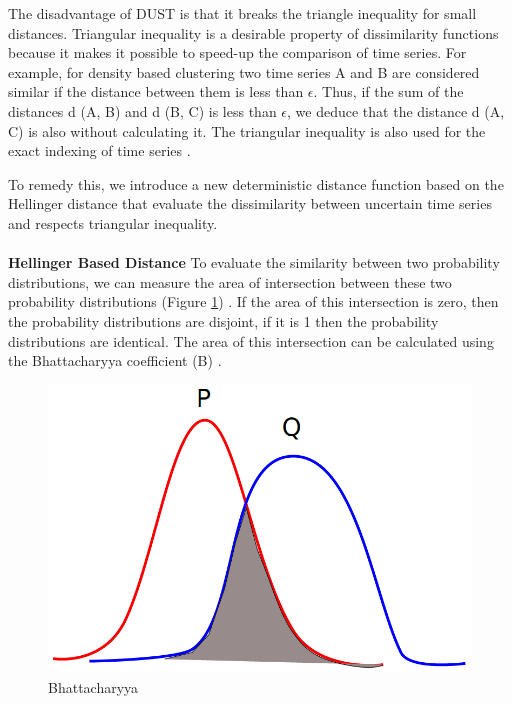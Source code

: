 

The disadvantage of DUST is that it  breaks the triangle inequality for small distances. Triangular inequality is a desirable property of dissimilarity functions because it makes it possible to speed-up the comparison of time series. For example, for density based clustering two time series A and B are considered similar if the distance between them is less than $\epsilon$. Thus, if the sum of the distances d (A, B) and d (B, C) is less than $\epsilon$, we deduce that the distance d (A, C) is also without calculating it. The triangular inequality is also used for the exact indexing of time series \cite{keogh2001locally}.


To remedy this, we introduce a new deterministic distance function based on the
Hellinger distance that evaluate the dissimilarity between uncertain time series and respects triangular inequality.

\paragraph{}\textbf{Hellinger Based Distance}
To evaluate the similarity between two probability distributions, we can measure the area of intersection between these two probability distributions (Figure \ref{Bhattacharyya}) . If the area of this intersection is zero, then the probability distributions are disjoint, if it is 1 then the probability distributions are identical. The area of this intersection can be calculated using the Bhattacharyya coefficient (B) \cite{patra2015new}.

\begin{figure}
\centering
\includegraphics[scale=0.4]{images/bhattacharyya}
\caption{Bhattacharyya}
\label{Bhattacharyya}

\end{figure}

